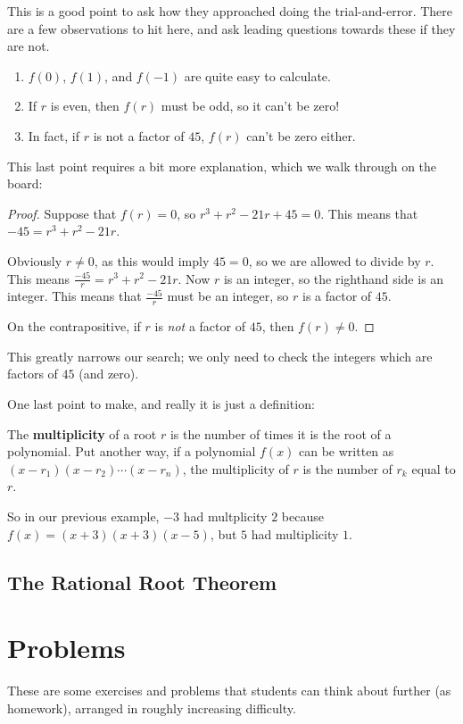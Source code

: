 This is a good point to ask how they approached doing the trial-and-error. There are a few observations to hit here, and ask leading questions towards these if they are not.

\begin{enumerate}
    \item $f(0)$, $f(1)$, and $f(-1)$ are quite easy to calculate.
    \item If $r$ is even, then $f(r)$ must be odd, so it can't be zero!
    \item In fact, if $r$ is not a factor of $45$, $f(r)$ can't be zero either.
\end{enumerate}

This last point requires a bit more explanation, which we walk through on the board:
\begin{proof}
    Suppose that $f(r) = 0$, so $r^3+r^2-21r+45 = 0$. This means that $-45 = r^3+r^2-21r$. 
    
    Obviously $r \neq 0$, as this would imply $45 = 0$, so we are allowed to divide by $r$. This means $\frac{-45}{r} = r^3+r^2-21r$. Now $r$ is an integer, so the righthand side is an integer. This means that $\frac{-45}{r}$ must be an integer, so $r$ is a factor of $45$.

    On the contrapositive, if $r$ is \emph{not} a factor of $45$, then $f(r) \neq 0$.
\end{proof}

This greatly narrows our search; we only need to check the integers which are factors of $45$ (and zero).

One last point to make, and really it is just a definition:

\begin{definition}
    The \textbf{multiplicity} of a root $r$ is the number of times it is the root of a polynomial. Put another way, if a polynomial $f(x)$ can be written as $(x-r_1)(x-r_2)\cdots (x-r_n)$, the multiplicity of $r$ is the number of $r_k$ equal to $r$.
\end{definition}

So in our previous example, $-3$ had multplicity $2$ because $f(x) = (x+3)(x+3)(x-5)$, but $5$ had multiplicity $1$.

\subsection{The Rational Root Theorem}

\section{Problems}

These are some exercises and problems that students can think about further (as homework), arranged in roughly increasing difficulty.